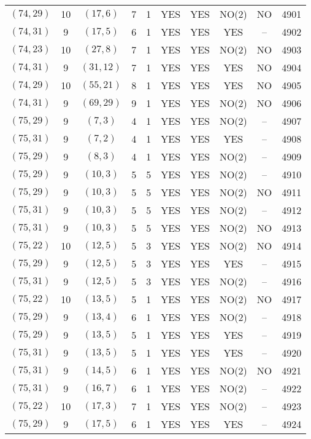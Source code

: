 \begin{longtable}{|c|c|c|c|c|c|c|c|c|c|}
$(74, 29)$ & 10 & $(17, 6)$ & 7 & 1 & YES & YES & NO(2) & NO & 4901\\
$(74, 31)$ & 9 & $(17, 5)$ & 6 & 1 & YES & YES & YES & -- & 4902\\
$(74, 23)$ & 10 & $(27, 8)$ & 7 & 1 & YES & YES & NO(2) & NO & 4903\\
$(74, 31)$ & 9 & $(31, 12)$ & 7 & 1 & YES & YES & YES & NO & 4904\\
$(74, 29)$ & 10 & $(55, 21)$ & 8 & 1 & YES & YES & YES & NO & 4905\\
$(74, 31)$ & 9 & $(69, 29)$ & 9 & 1 & YES & YES & NO(2) & NO & 4906\\
$(75, 29)$ & 9 & $(7, 3)$ & 4 & 1 & YES & YES & NO(2) & -- & 4907\\
$(75, 31)$ & 9 & $(7, 2)$ & 4 & 1 & YES & YES & YES & -- & 4908\\
$(75, 29)$ & 9 & $(8, 3)$ & 4 & 1 & YES & YES & NO(2) & -- & 4909\\
$(75, 29)$ & 9 & $(10, 3)$ & 5 & 5 & YES & YES & NO(2) & -- & 4910\\
$(75, 29)$ & 9 & $(10, 3)$ & 5 & 5 & YES & YES & NO(2) & NO & 4911\\
$(75, 31)$ & 9 & $(10, 3)$ & 5 & 5 & YES & YES & NO(2) & -- & 4912\\
$(75, 31)$ & 9 & $(10, 3)$ & 5 & 5 & YES & YES & NO(2) & NO & 4913\\
$(75, 22)$ & 10 & $(12, 5)$ & 5 & 3 & YES & YES & NO(2) & NO & 4914\\
$(75, 29)$ & 9 & $(12, 5)$ & 5 & 3 & YES & YES & YES & -- & 4915\\
$(75, 31)$ & 9 & $(12, 5)$ & 5 & 3 & YES & YES & NO(2) & -- & 4916\\
$(75, 22)$ & 10 & $(13, 5)$ & 5 & 1 & YES & YES & NO(2) & NO & 4917\\
$(75, 29)$ & 9 & $(13, 4)$ & 6 & 1 & YES & YES & NO(2) & -- & 4918\\
$(75, 29)$ & 9 & $(13, 5)$ & 5 & 1 & YES & YES & YES & -- & 4919\\
$(75, 31)$ & 9 & $(13, 5)$ & 5 & 1 & YES & YES & YES & -- & 4920\\
$(75, 31)$ & 9 & $(14, 5)$ & 6 & 1 & YES & YES & NO(2) & NO & 4921\\
$(75, 31)$ & 9 & $(16, 7)$ & 6 & 1 & YES & YES & NO(2) & -- & 4922\\
$(75, 22)$ & 10 & $(17, 3)$ & 7 & 1 & YES & YES & NO(2) & -- & 4923\\
$(75, 29)$ & 9 & $(17, 5)$ & 6 & 1 & YES & YES & YES & -- & 4924\\

\end{longtable}
